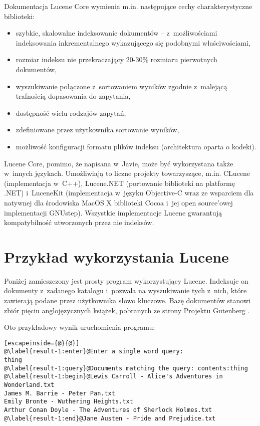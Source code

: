 Dokumentacja Lucene Core wymienia m.in. następujące cechy charakterystyczne biblioteki:
\begin{itemize}
 \item szybkie, skalowalne indeksowanie dokumentów -- z~możliwościami indeksowania inkrementalnego wykazującego się podobnymi właściwościami,
 \item rozmiar indeksu nie przekraczający 20-30\% rozmiaru pierwotnych dokumentów,
 \item wyszukiwanie połączone z~sortowaniem wyników zgodnie z~malejącą trafnością dopasowania do zapytania,
 \item dostępność wielu rodzajów zapytań,
 \item zdefiniowane przez użytkownika sortowanie wyników,
 \item możliwość konfiguracji formatu plików indeksu (architektura oparta o kodeki).
\end{itemize}

Lucene Core, pomimo, że napisana w~Javie, może być wykorzystana także w~innych językach. Umożliwiają to liczne projekty towarzyszące, m.in. CLucene (implementacja w~C++), Lucene.NET (portowanie biblioteki na platformę .NET) i~LuceneKit (implementacja w~języku Objective-C wraz ze wsparciem dla natywnej dla środowiska MacOS X biblioteki Cocoa i~jej open source'owej implementacji GNUstep). Wszystkie implementacje Lucene gwarantują kompatybilność utworzonych przez nie indeksów.

\section{Przykład wykorzystania Lucene}

Poniżej zamieszczony jest prosty program wykorzystujący Lucene. Indeksuje on dokumenty z~zadanego katalogu i~pozwala na wyszukiwanie tych z~nich, które zawierają podane przez użytkownika słowo kluczowe. Bazę dokumentów stanowi zbiór pięciu anglojęzycznych książek, pobranych ze strony Projektu Gutenberg \cite{gutenberg}.

Oto przykładowy wynik uruchomienia programu:
\begin{lstlisting}[escapeinside={@}{@}]
@\label{result-1:enter}@Enter a single word query:
thing
@\label{result-1:query}@Documents matching the query: contents:thing
@\label{result-1:begin}@Lewis Carroll - Alice's Adventures in Wonderland.txt
James M. Barrie - Peter Pan.txt
Emily Bronte - Wuthering Heights.txt
Arthur Conan Doyle - The Adventures of Sherlock Holmes.txt
@\label{result-1:end}@Jane Austen - Pride and Prejudice.txt
\end{lstlisting}

